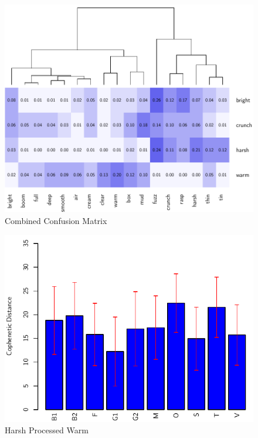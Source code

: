		\begin{figure}[h!]
			\centering
			\includegraphics{chapter7/Images/CombinedConfusion.pdf}
			\caption{Combined Confusion Matrix}
		\end{figure}

		\begin{figure}[h!]
			\centering
			\includegraphics{chapter7/Images/HarshProcessedWarmBar.pdf}
			\caption{Harsh Processed Warm}
		\end{figure}

